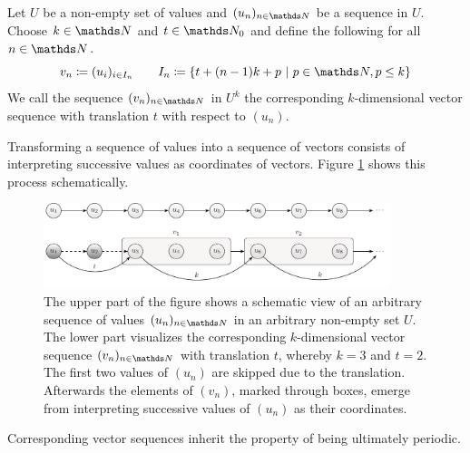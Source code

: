 \documentclass{stdlocal}
\begin{document}
    \begin{definition}
      Let $U$ be a non-empty set of values and $(u_n)_{n\in\setNatural}$ be a sequence in $U$.
      Choose $k\in\setNatural$ and $t\in\setNatural_0$ and define the following for all $n\in\setNatural$.
      \[
        v_n \define (u_i)_{i\in I_n}
        \separate
        I_n \define \set{t + (n-1)k + p}{p\in\setNatural, p \leq k}
      \]
      We call the sequence $(v_n)_{n\in\setNatural}$ in $U^k$ the corresponding $k$-dimensional vector sequence with translation $t$ with respect to $(u_n)$.
    \end{definition}
    Transforming a sequence of values into a sequence of vectors consists of interpreting successive values as coordinates of vectors.
    Figure \ref{fig:vector-sequence-scheme} shows this process schematically.
    \begin{figure}
      \center
      \includegraphics[width=0.9\textwidth]{figures/vector_sequence_scheme.pdf}
      \caption[Corresponding Vector Sequence Scheme]{%
        The upper part of the figure shows a schematic view of an arbitrary sequence of values $(u_n)_{n\in\setNatural}$ in an arbitrary non-empty set $U$.
        The lower part visualizes the corresponding $k$-dimensional vector sequence $(v_n)_{n\in\setNatural}$ with translation $t$, whereby $k=3$ and $t=2$.
        The first two values of $(u_n)$ are skipped due to the translation.
        Afterwards the elements of $(v_n)$, marked through boxes, emerge from interpreting successive values of $(u_n)$ as their coordinates.
      }
      \label{fig:vector-sequence-scheme}
    \end{figure}
    Corresponding vector sequences inherit the property of being ultimately periodic.
\end{document}
